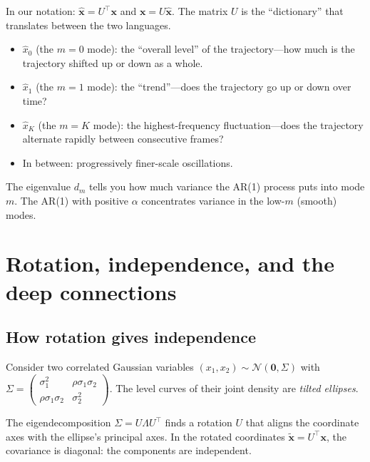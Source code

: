 \documentclass[11pt,a4paper]{article}
\begin{document}
In our notation: $\hat{\mathbf{x}} = U^\top\mathbf{x}$ and $\mathbf{x} = U\hat{\mathbf{x}}$.  The matrix $U$ is the ``dictionary'' that translates between the two languages.

\begin{intuitionbox}
\begin{itemize}[nosep]
  \item $\hat{x}_0$ (the $m=0$ mode): the ``overall level'' of the trajectory---how much is the trajectory shifted up or down as a whole.
  \item $\hat{x}_1$ (the $m=1$ mode): the ``trend''---does the trajectory go up or down over time?
  \item $\hat{x}_K$ (the $m=K$ mode): the highest-frequency fluctuation---does the trajectory alternate rapidly between consecutive frames?
  \item In between: progressively finer-scale oscillations.
\end{itemize}
The eigenvalue $d_m$ tells you how much variance the AR(1) process puts into mode $m$.  The AR(1) with positive $\alpha$ concentrates variance in the low-$m$ (smooth) modes.
\end{intuitionbox}


\section{Rotation, independence, and the deep connections}
\label{sec:q22}

\subsection{How rotation gives independence}

Consider two correlated Gaussian variables $(x_1, x_2) \sim \mathcal{N}(\mathbf{0}, \Sigma)$ with
$\Sigma = \begin{pmatrix} \sigma_1^2 & \rho\sigma_1\sigma_2 \\ \rho\sigma_1\sigma_2 & \sigma_2^2 \end{pmatrix}$.
The level curves of their joint density are \emph{tilted ellipses}.

The eigendecomposition $\Sigma = U\Lambda U^\top$ finds a rotation $U$ that aligns the coordinate axes with the ellipse's principal axes.  In the rotated coordinates $\tilde{\mathbf{x}} = U^\top\mathbf{x}$, the covariance is diagonal: the components are independent.
\end{document}
